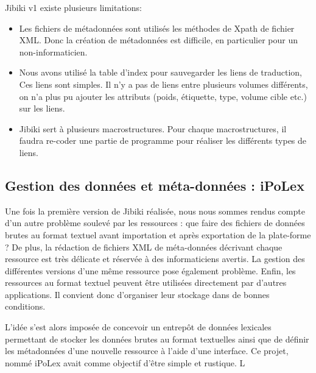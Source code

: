 \documentclass[10pt,a4paper,twoside]{article}
\begin{document}
\begin{itemize}
Jibiki v1 existe plusieurs limitations:
\begin{itemize}
\begin{itemize}
\item Les fichiers de métadonnées sont utilisés les méthodes de Xpath de fichier XML. Donc la création de métadonnées est difficile, en particulier pour un non-informaticien.
\item Nous avons utilisé la table d'index pour sauvegarder les liens de traduction, Ces liens sont simples. Il n'y a pas de liens entre plusieurs volumes différents, on n'a plus pu ajouter les attributs (poids, étiquette, type, volume cible etc.) sur les liens. 
\item Jibiki sert à plusieurs macrostructures. Pour chaque macrostructures, il faudra re-coder une partie de programme pour réaliser les différents types de liens.
\end{itemize}
\end{itemize}


\cite{MMAC06}

\subsection{Gestion des données et méta-données : iPoLex}


Une fois la première version de Jibiki réalisée, nous nous sommes rendus compte d'un autre problème soulevé par les ressources : que faire des fichiers de données brutes au format textuel avant importation et après exportation de la plate-forme ? 
De plus, la rédaction de fichiers XML de méta-données décrivant chaque ressource est très délicate et réservée à des informaticiens avertis.
La gestion des différentes versions d'une même ressource pose également problème.
Enfin, les ressources au format textuel peuvent être utilisées directement par d'autres applications. Il convient donc d'organiser leur stockage dans de bonnes conditions.

L'idée s'est alors imposée de concevoir un entrepôt de données lexicales permettant de stocker les données brutes au format textuelles ainsi que de définir les métadonnées d'une nouvelle ressource à l'aide d'une interface. Ce projet, nommé iPoLex avait comme objectif d'être simple et rustique. L


\end{itemize}
\end{document}
